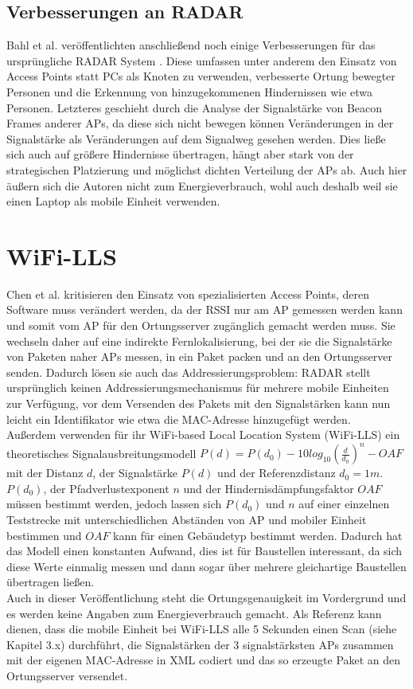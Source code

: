 \subsection{Verbesserungen an RADAR}
Bahl et al. veröffentlichten anschließend noch einige Verbesserungen für das ursprüngliche RADAR System \cite{bahl2000enhancements}.
Diese umfassen unter anderem den Einsatz von Access Points statt PCs als Knoten zu verwenden, verbesserte Ortung bewegter Personen und die Erkennung von hinzugekommenen Hindernissen wie etwa Personen.
Letzteres geschieht durch die Analyse der Signalstärke von Beacon Frames anderer APs, da diese sich nicht bewegen können Veränderungen in der Signalstärke als Veränderungen auf dem Signalweg gesehen werden.
Dies ließe sich auch auf größere Hindernisse übertragen, hängt aber stark von der strategischen Platzierung und möglichst dichten Verteilung der APs ab.
Auch hier äußern sich die Autoren nicht zum Energieverbrauch, wohl auch deshalb weil sie einen Laptop als mobile Einheit verwenden.


\section{WiFi-LLS}
\label{ch:Vorherige:sec:LLS}
Chen et al. kritisieren den Einsatz von spezialisierten Access Points, deren Software muss verändert werden, da der RSSI nur am AP gemessen werden kann und somit vom AP für den Ortungsserver zugänglich gemacht werden muss. 
Sie wechseln daher auf eine indirekte Fernlokalisierung, bei der sie die Signalstärke von Paketen naher APs messen, in ein Paket packen und an den Ortungsserver senden. 
Dadurch lösen sie auch das Addressierungsproblem: RADAR stellt ursprünglich keinen Addressierungsmechanismus für mehrere mobile Einheiten zur Verfügung, vor dem Versenden des Pakets mit den Signalstärken kann nun leicht ein Identifikator wie etwa die MAC-Adresse hinzugefügt werden.\\
Außerdem verwenden für ihr WiFi-based Local Location System (WiFi-LLS) ein theoretisches Signalausbreitungsmodell $P(d) = P(d_0) - 10log_{10}(\frac{d}{d_0})^n - OAF$ mit der Distanz $d$, der Signalstärke $P(d)$ und der Referenzdistanz $d_0 = 1m$. 
$P(d_0)$, der Pfadverlustexponent $n$ und der Hindernisdämpfungsfaktor $OAF$ müssen bestimmt werden, jedoch lassen sich $P(d_0)$ und $n$ auf einer einzelnen Teststrecke mit unterschiedlichen Abständen von AP und mobiler Einheit bestimmen und $OAF$ kann für einen Gebäudetyp bestimmt werden.
Dadurch hat das Modell einen konstanten Aufwand, dies ist für Baustellen interessant, da sich diese Werte einmalig messen und dann sogar über mehrere gleichartige Baustellen übertragen ließen.\\
Auch in dieser Veröffentlichung steht die Ortungsgenauigkeit im Vordergrund und es werden keine Angaben zum Energieverbrauch gemacht. 
Als Referenz kann dienen, dass die mobile Einheit bei WiFi-LLS alle 5 Sekunden einen Scan (siehe Kapitel 3.x) durchführt, die Signalstärken der 3 signalstärksten APs zusammen mit der eigenen MAC-Adresse in XML codiert und das so erzeugte Paket an den Ortungsserver versendet.

